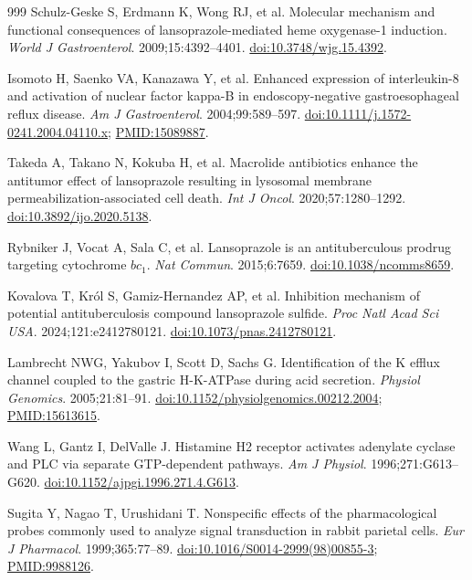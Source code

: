 \documentclass[11pt,a4paper,notitlepage]{report}
\begin{document}
\begin{thebibliography}{999}
 Schulz-Geske S, Erdmann K, Wong RJ, et al. Molecular mechanism and functional consequences of lansoprazole-mediated heme oxygenase-1 induction. \textit{World J Gastroenterol}. 2009;15:4392--4401. \href{https://doi.org/10.3748/wjg.15.4392}{doi:10.3748/wjg.15.4392}.

 Isomoto H, Saenko VA, Kanazawa Y, et al. Enhanced expression of interleukin-8 and activation of nuclear factor kappa-B in endoscopy-negative gastroesophageal reflux disease. \textit{Am J Gastroenterol}. 2004;99:589--597. \href{https://doi.org/10.1111/j.1572-0241.2004.04110.x}{doi:10.1111/j.1572-0241.2004.04110.x}; \href{https://pubmed.ncbi.nlm.nih.gov/15089887/}{PMID:15089887}.

 Takeda A, Takano N, Kokuba H, et al. Macrolide antibiotics enhance the antitumor effect of lansoprazole resulting in lysosomal membrane permeabilization-associated cell death. \textit{Int J Oncol}. 2020;57:1280--1292. \href{https://doi.org/10.3892/ijo.2020.5138}{doi:10.3892/ijo.2020.5138}.

 Rybniker J, Vocat A, Sala C, et al. Lansoprazole is an antituberculous prodrug targeting cytochrome $bc_1$. \textit{Nat Commun}. 2015;6:7659. \href{https://doi.org/10.1038/ncomms8659}{doi:10.1038/ncomms8659}.

 Kovalova T, Król S, Gamiz-Hernandez AP, et al. Inhibition mechanism of potential antituberculosis compound lansoprazole sulfide. \textit{Proc Natl Acad Sci USA}. 2024;121:e2412780121. \href{https://doi.org/10.1073/pnas.2412780121}{doi:10.1073/pnas.2412780121}.

 Lambrecht NWG, Yakubov I, Scott D, Sachs G. Identification of the K efflux channel coupled to the gastric H-K-ATPase during acid secretion. \textit{Physiol Genomics}. 2005;21:81--91. \href{https://doi.org/10.1152/physiolgenomics.00212.2004}{doi:10.1152/physiolgenomics.00212.2004}; \href{https://pubmed.ncbi.nlm.nih.gov/15613615/}{PMID:15613615}.

 Wang L, Gantz I, DelValle J. Histamine H2 receptor activates adenylate cyclase and PLC via separate GTP-dependent pathways. \textit{Am J Physiol}. 1996;271:G613--G620. \href{https://doi.org/10.1152/ajpgi.1996.271.4.G613}{doi:10.1152/ajpgi.1996.271.4.G613}.

 Sugita Y, Nagao T, Urushidani T. Nonspecific effects of the pharmacological probes commonly used to analyze signal transduction in rabbit parietal cells. \textit{Eur J Pharmacol}. 1999;365:77--89. \href{https://doi.org/10.1016/S0014-2999(98)00855-3}{doi:10.1016/S0014-2999(98)00855-3}; \href{https://pubmed.ncbi.nlm.nih.gov/9988126/}{PMID:9988126}.


\end{thebibliography}
\end{document}
